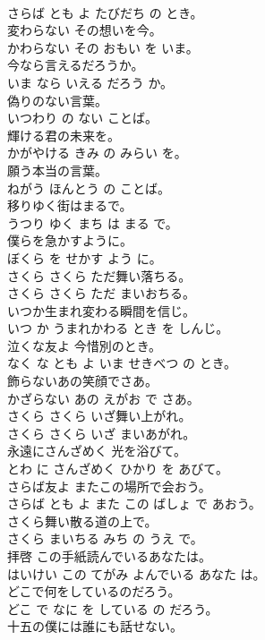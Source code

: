 \documentclass[8pt]{extreport}
\begin{document}
\begin{CJK}{UTF8}{min}
\\	さらば とも よ たびだち の とき。	
\\	変わらない その想いを今。	
\\	かわらない その おもい を いま。	
\\	今なら言えるだろうか。	
\\	いま なら いえる だろう か。	
\\	偽りのない言葉。	
\\	いつわり の ない ことば。	
\\	輝ける君の未来を。	
\\	かがやける きみ の みらい を。	
\\	願う本当の言葉。	
\\	ねがう ほんとう の ことば。	
\\	移りゆく街はまるで。	
\\	うつり ゆく まち は まる で。	
\\	僕らを急かすように。	
\\	ぼくら を せかす よう に。	
\\	さくら さくら ただ舞い落ちる。	
\\	さくら さくら ただ まいおちる。	
\\	いつか生まれ変わる瞬間を信じ。	
\\	いつ か うまれかわる とき を しんじ。	
\\	泣くな友よ 今惜別のとき。	
\\	なく な とも よ いま せきべつ の とき。	
\\	飾らないあの笑顔でさあ。	
\\	かざらない あの えがお で さあ。	
\\	さくら さくら いざ舞い上がれ。	
\\	さくら さくら いざ まいあがれ。	
\\	永遠にさんざめく 光を浴びて。	
\\	とわ に さんざめく ひかり を あびて。	
\\	さらば友よ またこの場所で会おう。	
\\	さらば とも よ また この ばしょ で あおう。	
\\	さくら舞い散る道の上で。	
\\	さくら まいちる みち の うえ で。	
\\	拝啓 この手紙読んでいるあなたは。	
\\	はいけい この てがみ よんでいる あなた は。	
\\	どこで何をしているのだろう。	
\\	どこ で なに を している の だろう。	
\\	十五の僕には誰にも話せない。	

\end{CJK}
\end{document}
